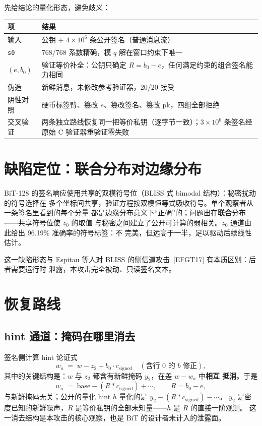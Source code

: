 \documentclass[UTF8,11pt,a4paper]{ctexart}
\newcommand{\code}[1]{\texttt{\small #1}}
\begin{document}
先给结论的量化形态，避免歧义：

\begin{table}[htbp]\centering\small
\begin{tabular}{@{}ll@{}}
\toprule
项 & 结果 \\
\midrule
输入 & 公钥 $+$ $4\times10^6$ 条公开签名（普通消息流） \\
\code{s0} & 768/768 系数精确，模 $q$ 解在窗口约束下唯一 \\
$(e,b_0)$ & 验证等价补全：公钥只确定 $R=b_0-e$，任何满足约束的组合签名能力相同 \\
伪造 & 新鲜消息，未修改参考验证器，20/20 接受 \\
阴性对照 & 硬币标签臂、篡改 $e$、篡改签名、篡改 pk，四组全部拒绝 \\
交叉验证 & 两条独立路线恢复同一把等价私钥（逐字节一致）；$3\times10^6$ 条签名经原始 C 验证器重验证零失败 \\
\bottomrule
\end{tabular}
\end{table}

\section{缺陷定位：联合分布对边缘分布}

BiT-128 的签名响应使用共享的双模符号位（BLISS 式 bimodal 结构）：秘密扰动的符号选择在
多个坐标间共享，验证方程按双模恒等式吸收符号。单个观察者从一条签名里看到的每个分量
都是边缘分布意义下``正确''的；问题出在\textbf{联合}分布——共享符号位使 $z_0$ 的取值
与秘密之间建立了公开可计算的弱相关。$z_0$ 通道由此给出 96.19\% 准确率的符号标签：不
完美，但远高于一半，足以驱动后续线性估计。

这一缺陷形态与 Espitau 等人对 BLISS 的侧信道攻击~[EFGT17] 有本质区别：后者需要运行时
泄露，本攻击完全被动、只读签名文本。

\section{恢复路线}

\subsection{hint 通道：掩码在哪里消去}

签名侧计算 hint 论证式
\[
w_a \;=\; w - z_2 + b_0\cdot c_{\mathrm{signed}}\quad(\text{含行 0 的 } b \text{ 修正}),
\]
其中的关键结构是：$w$ 与 $z_2$ 都含有新鲜掩码 $y_2$，在差 $w - w_a$ 中\textbf{相互
抵消}。于是
\[
w_a \;=\; \mathrm{base} - (R * c_{\mathrm{signed}}) + \cdots,\qquad R = b_0 - e,
\]
与新鲜掩码无关；公开的量化 hint $h$ 量化的是 $y_2 - (R * c_{\mathrm{signed}}) - \cdots$。
$y_2$ 是密度已知的新鲜噪声，$R$ 是等价私钥的全部未知量——$h$ 是 $R$ 的直接一阶观测。
这一消去结构是本攻击的核心观察，也是 BiT 的设计者未计入的泄露面。
\end{document}
